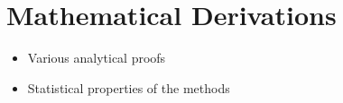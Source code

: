 \chapter{Mathematical Derivations}
\begin{itemize}
\item Various analytical proofs
\item Statistical properties of the methods
\end{itemize}